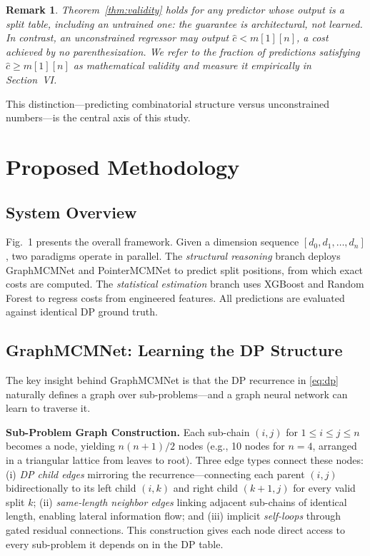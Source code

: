 \documentclass[conference]{IEEEtran}
\newtheorem{remark}{Remark}
\begin{document}
\begin{remark}
Theorem~\ref{thm:validity} holds for \emph{any} predictor whose output is a
split table, including an untrained one: the guarantee is architectural, not
learned. In contrast, an unconstrained regressor may output
$\hat{c} < m[1][n]$, a cost achieved by no parenthesization. We refer to the
fraction of predictions satisfying $\hat{c} \ge m[1][n]$ as
\emph{mathematical validity} and measure it empirically in Section~VI.
\end{remark}

This distinction---predicting combinatorial structure versus unconstrained
numbers---is the central axis of this study.

\section{Proposed Methodology}

\subsection{System Overview}
Fig.~1 presents the overall framework. Given a dimension sequence
$[d_0, d_1, \ldots, d_n]$, two paradigms operate in parallel. The
\emph{structural reasoning} branch deploys GraphMCMNet and PointerMCMNet to
predict split positions, from which exact costs are computed. The
\emph{statistical estimation} branch uses XGBoost and Random Forest to regress
costs from engineered features. All predictions are evaluated against
identical DP ground truth.

\subsection{GraphMCMNet: Learning the DP Structure}
The key insight behind GraphMCMNet is that the DP recurrence in \eqref{eq:dp}
naturally defines a graph over sub-problems---and a graph neural network can
learn to traverse it.

\textbf{Sub-Problem Graph Construction.} Each sub-chain $(i,j)$ for
$1 \le i \le j \le n$ becomes a node, yielding $n(n{+}1)/2$ nodes (e.g., 10
nodes for $n{=}4$, arranged in a triangular lattice from leaves to root). Three
edge types connect these nodes: (i) \emph{DP child edges} mirroring the
recurrence---connecting each parent $(i,j)$ bidirectionally to its left child
$(i,k)$ and right child $(k{+}1,j)$ for every valid split $k$; (ii)
\emph{same-length neighbor edges} linking adjacent sub-chains of identical
length, enabling lateral information flow; and (iii) implicit \emph{self-loops}
through gated residual connections. This construction gives each node direct
access to every sub-problem it depends on in the DP table.
\end{document}

